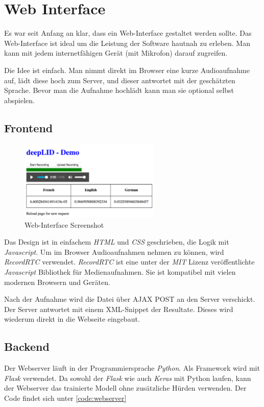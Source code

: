 \section{Web Interface}
Es war seit Anfang an klar, dass ein Web-Interface gestaltet werden sollte. Das Web-Interface ist ideal um die Leistung der Software hautnah zu erleben. Man kann mit jedem internetfähigen Gerät (mit Mikrofon) darauf zugreifen.

Die Idee ist einfach. Man nimmt direkt im Browser eine kurze Audioaufnahme auf, lädt diese hoch zum Server, und dieser antwortet mit der geschätzten Sprache. Bevor man die Aufnahme hochlädt kann man sie optional selbst abspielen.


\subsection{Frontend}
\begin{figure}[hbt]
	\centering
		\includegraphics[width=0.6\textwidth]{assets/interface.png}
	\caption{Web-Interface Screenshot}
	\label{img:interface}
\end{figure}
Das Design ist in einfachem \textit{HTML} und \textit{CSS} geschrieben, die Logik mit \textit{Javascript}. Um im Browser Audioaufnahmen nehmen zu können, wird \textit{RecordRTC}\cite{recordrtc} verwendet. \textit{RecordRTC} ist eine unter der \textit{MIT} Lizenz veröffentlichte \textit{Javascript} Bibliothek für Medienaufnahmen. Sie ist kompatibel mit vielen modernen Browsern und Geräten.

Nach der Aufnahme wird die Datei über AJAX POST an den Server verschickt. Der Server antwortet mit einem XML-Snippet der Resultate.
Dieses wird wiederum direkt in die Webseite eingebaut.


\subsection{Backend}
Der Webserver läuft in der Programmiersprache \textit{Python}. Als Framework wird mit \textit{Flask}\cite{flask} verwendet. Da sowohl der \textit{Flask} wie auch \textit{Keras} mit Python laufen, kann der Webserver das trainierte Modell ohne zusätzliche Hürden verwenden.
Der Code findet sich unter \ref{code:webserver}
